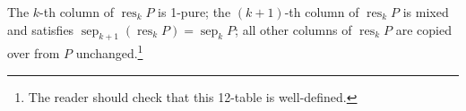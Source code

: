 \documentclass[numbers=enddot,12pt,final,onecolumn,notitlepage]{scrartcl}%
\theoremstyle{definition}
\begin{document}
\begin{itemize}
The $k$-th column of $\operatorname*{res}_{k}P$ is 1-pure; the $\left(  k+1\right)  $-th column of $\operatorname*{res}%
\nolimits_{k}P$ is mixed and satisfies $\operatorname*{sep}\nolimits_{k+1}%
\left(  \operatorname*{res}\nolimits_{k}P\right)  =\operatorname*{sep}%
\nolimits_{k}P$; all other columns of $\operatorname*{res}\nolimits_{k}P$ are
copied over from $P$ unchanged.\footnote{The reader should check that
this 12-table is well-defined.
}


\end{itemize}
\end{document}
